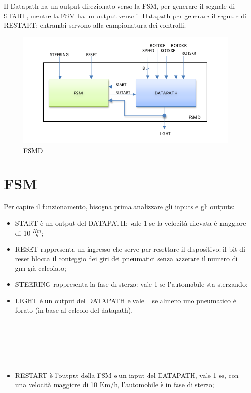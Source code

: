 \documentclass[a4paper,titlepage]{book}
\begin{document}
Il Datapath ha un output direzionato verso la FSM, per generare il segnale di START, mentre la FSM ha un output verso il Datapath per generare il segnale di RESTART; entrambi servono alla campionatura dei controlli.


\begin{figure}[!hb]
\centering
\includegraphics[scale=0.9]{schemi/fsmd.png}
\caption{FSMD}
\end{figure}


\chapter{FSM}

Per capire il funzionamento, bisogna prima analizzare gli inputs e gli outputs:
\begin{itemize}

\item START è un output del DATAPATH: vale 1 se la velocità rilevata è maggiore di 10 $\frac{Km}{h}$;
\item RESET rappresenta un ingresso che serve per resettare il dispositivo: il bit di reset blocca il conteggio dei giri dei pneumatici senza azzerare il numero di giri già calcolato;
\item STEERING rappresenta la fase di sterzo: vale 1 se l'automobile sta sterzando;
\item LIGHT è un output del DATAPATH e vale 1 se almeno uno pneumatico è forato (in base al calcolo del datapath).
~

~

~

~
\item RESTART è l'output della FSM e un input del DATAPATH, vale 1 se, con una velocità maggiore di 10 Km/h, l'automobile è in fase di sterzo;

\end{itemize}
\end{document}
